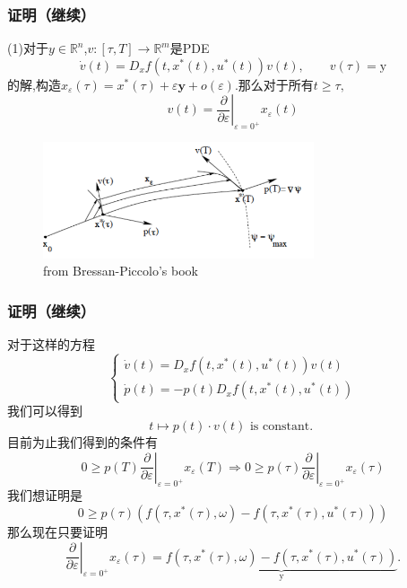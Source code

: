 \documentclass[UTF8, aspectratio=169, 9pt]{ctexbeamer}
\begin{document}
\begin{frame}
\frametitle{证明（继续） }

(1)对于$y \in \mathbb{R}^n$,$v:[\tau, T] \to \mathbb{R}^m$是PDE
$$
\dot{v}(t)=D_{x} f\left(t, x^{*}(t), u^{*}(t)\right) v(t), \qquad v(\tau)=\mathrm{y}
$$
的解,构造$x_{\varepsilon}(\tau)=x^{*}(\tau)+\varepsilon \mathbf{y}+o(\varepsilon)$.那么对于所有$t \ge \tau , $
$$
v(t)=\left.\frac{\partial}{\partial \varepsilon}\right|_{\varepsilon=0^{+}} x_{\varepsilon}(t)
$$

\begin{figure}
  \centering
  \includegraphics[width=8cm]{variationalequation.png}
  \caption{from Bressan-Piccolo's book}
\end{figure}
\end{frame}

\begin{frame}
\frametitle{证明（继续） }
对于这样的方程
$$
\left\{\begin{array}{l}
\dot{v}(t)=D_{x} f\left(t, x^{*}(t), u^{*}(t)\right) v(t) \\
\dot{p}(t)=-p(t) D_{x} f\left(t, x^{*}(t), u^{*}(t)\right)
\end{array}\right.
$$
我们可以得到
$$
t \mapsto p(t) \cdot v(t) \text { is constant. }
$$
目前为止我们得到的条件有
$$
0 \geq\left. p(T) \frac{\partial}{\partial \varepsilon}\right|_{\varepsilon=0^{+}} x_{\varepsilon}(T)
\Rightarrow
0 \geq\left. p(\tau) \frac{\partial}{\partial \varepsilon}\right|_{\varepsilon=0^{+}} x_{\varepsilon}(\tau)
$$
我们想证明是
$$
0 \geq p(\tau)\left(f\left(\tau, x^{*}(\tau), \omega\right)-f\left(\tau, x^{*}(\tau), u^{*}(\tau)\right)\right)
$$
那么现在只要证明
$$
\left.\frac{\partial}{\partial \varepsilon}\right|_{\varepsilon=0^{+}} x_{\varepsilon}(\tau)=\underbrace{f\left(\tau, x^{*}(\tau), \omega\right)-f\left(\tau, x^{*}(\tau), u^{*}(\tau)\right)}_{\mathrm{y}}.
$$
\end{frame}
\end{document}
